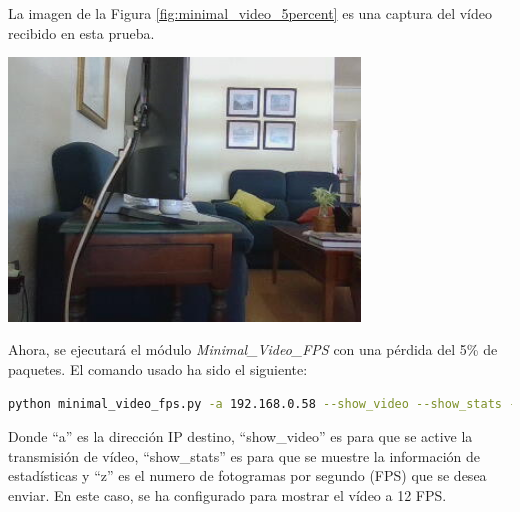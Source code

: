 \newpage

La imagen de la Figura \ref{fig:minimal_video_5percent} es una captura del vídeo recibido en esta prueba.
\begin{center}
  \includegraphics[width = 0.7\textwidth]{images/VideoRecibido7.1.png}
  \label{fig:minimal_video_5percent}
\end{center}
\newpage


Ahora, se ejecutará el módulo \textit{Minimal\_Video\_FPS} con una pérdida del 5\% de paquetes. El comando usado ha sido el siguiente:

\begin{lstlisting}[language=bash, basicstyle=\ttfamily\scriptsize]
    python minimal_video_fps.py -a 192.168.0.58 --show_video --show_stats -z 12
\end{lstlisting}
Donde ``a'' es la dirección IP destino, ``show\_video'' es para que se active la transmisión de vídeo, ``show\_stats'' es para que se muestre la información de estadísticas y ``z'' es el numero de fotogramas por segundo (FPS) que se desea enviar. En este caso, se ha configurado para mostrar el vídeo a 12 FPS.
\vspace{\baselineskip}

